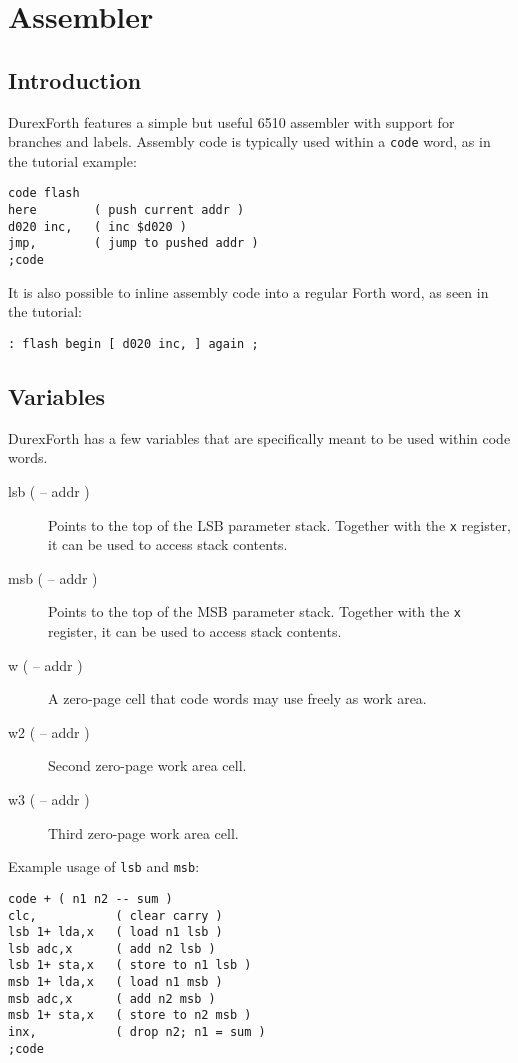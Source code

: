 \chapter{Assembler}

\section{Introduction}

DurexForth features a simple but useful 6510 assembler with support for branches and labels. Assembly code is typically used within a \texttt{code} word, as in the tutorial example:

\begin{verbatim}
code flash
here        ( push current addr )
d020 inc,   ( inc $d020 )
jmp,        ( jump to pushed addr )
;code
\end{verbatim}

It is also possible to inline assembly code into a regular Forth word, as seen in the tutorial:

\begin{verbatim}
: flash begin [ d020 inc, ] again ;
\end{verbatim}

\section{Variables}

DurexForth has a few variables that are specifically meant to be used within code words.

\begin{description}
    \item[lsb ( -- addr )] Points to the top of the LSB parameter stack. Together with the \texttt{x} register, it can be used to access stack contents.
    \item[msb ( -- addr )] Points to the top of the MSB parameter stack. Together with the \texttt{x} register, it can be used to access stack contents.
    \item[w ( -- addr )] A zero-page cell that code words may use freely as work area.
    \item[w2 ( -- addr )] Second zero-page work area cell.
    \item[w3 ( -- addr )] Third zero-page work area cell.
\end{description}

Example usage of \texttt{lsb} and \texttt{msb}:

\begin{verbatim}
code + ( n1 n2 -- sum )
clc,           ( clear carry )
lsb 1+ lda,x   ( load n1 lsb )
lsb adc,x      ( add n2 lsb )
lsb 1+ sta,x   ( store to n1 lsb )
msb 1+ lda,x   ( load n1 msb )
msb adc,x      ( add n2 msb )
msb 1+ sta,x   ( store to n2 msb )
inx,           ( drop n2; n1 = sum )
;code
\end{verbatim}

